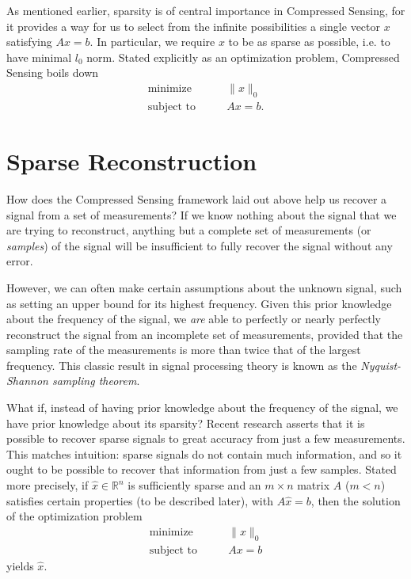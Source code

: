 As mentioned earlier, sparsity is of central importance in Compressed Sensing, for it provides a way for us to 
select from the infinite possibilities a single vector $x$ satisfying $Ax = b$. In particular, we require $x$ to 
be as sparse as possible, i.e. to have minimal $l_0$ norm. Stated explicitly as an optimization problem, Compressed
Sensing boils down 
\begin{align*}
\text{minimize}\qquad &\|x\|_0\\
\text{subject to} \qquad &Ax = b.
\end{align*}

\section*{Sparse Reconstruction}
How does the Compressed Sensing framework laid out above help us recover a signal from a set of measurements? 
If we know nothing about the signal that we are trying to reconstruct, anything but a complete set of measurements
(or \emph{samples}) of the signal will be insufficient to fully recover the signal without any error. 

However, we can often make certain assumptions about the unknown signal, such as setting an upper bound for
its highest frequency. Given this prior knowledge about the frequency of the signal, we \emph{are} able to 
perfectly or nearly perfectly reconstruct the signal from an incomplete set of measurements, provided that
the sampling rate of the measurements is more than twice that of the largest frequency. This classic result
in signal processing theory is known as the \emph{Nyquist-Shannon sampling theorem}.

What if, instead of having prior knowledge about the frequency of the signal, we have prior knowledge about
its sparsity? Recent research asserts that it is possible to recover sparse signals to great accuracy from just 
a few measurements. This matches intuition: sparse signals do not contain much information, and so it ought to
be possible to recover that information from just a few samples. Stated more precisely, if $\hat{x} \in \mathbb{R}^n$ 
is sufficiently sparse and an $m \times n$ matrix $A$ ($m < n$) satisfies certain properties (to be described later),
with $A\hat{x} = b$, then the solution of the optimization problem
\begin{align*}
\text{minimize}\qquad &\|x\|_0\\
\text{subject to}\qquad &Ax = b
\end{align*}
yields $\hat{x}$. 

